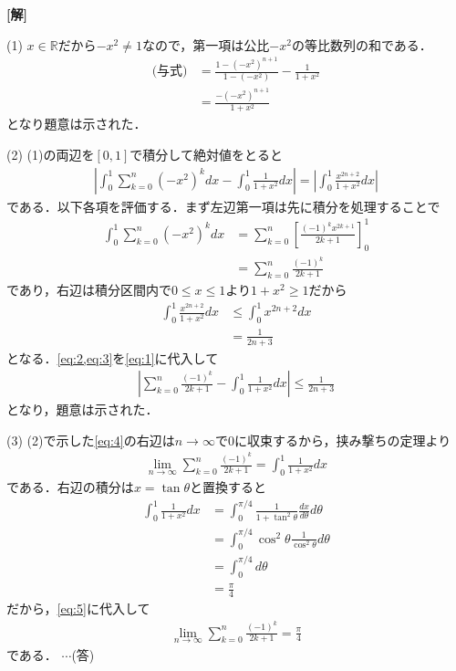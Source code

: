 \documentclass[a4paper,10pt]{ltjsarticle}
\begin{document}
\begin{multicols}{2}
  {\bf[解]}

  (1)
  $x \in \mathbb{R}$だから$-x^2 \neq 1$なので，第一項は公比$-x^2$の等比数列の和である．
  \begin{align*}
    \text{(与式)}
     & = \frac{1-(-x^2)^{n+1}}{1-(-x^2)} - \frac{1}{1+x^2} \\
     & = \frac{-(-x^2)^{n+1}}{1+x^2}
  \end{align*}
  となり題意は示された．

  \vspace{10pt}
  (2)
  (1)の両辺を$[0,1]$で積分して絶対値をとると
  \begin{align}
    \left| \int_0^1 \sum_{k=0}^n (-x^2)^k dx - \int_0^1 \frac{1}{1+x^2} dx \right|
    = \left| \int_0^1 \frac{x^{2n+2}}{1+x^2} dx \right| \label{eq:1}
  \end{align}
  である．以下各項を評価する．まず左辺第一項は先に積分を処理することで
  \begin{align}
    \int_0^1 \sum_{k=0}^n (-x^2)^k dx
     & = \sum_{k=0}^n \left[ \frac{(-1)^k x^{2k+1}}{2k+1} \right]_0^1 \nonumber \\
     & = \sum_{k=0}^n \frac{(-1)^k}{2k+1} \label{eq:2}
  \end{align}
  であり，右辺は積分区間内で$0\le x\le 1$より$1+x^2\ge 1$だから
  \begin{align}
    \int_0^1 \frac{x^{2n+2}}{1+x^2} dx
     & \le \int_0^1 x^{2n+2} dx      \nonumber \\
     & = \frac{1}{2n+3} \label{eq:3}
  \end{align}
  となる．\cref{eq:2,eq:3}を\cref{eq:1}に代入して
  \begin{align}
    \left| \sum_{k=0}^n \frac{(-1)^k}{2k+1} - \int_0^1 \frac{1}{1+x^2} dx \right| \le \frac{1}{2n+3} \label{eq:4}
  \end{align}
  となり，題意は示された．

  \vspace{10pt}
  (3)
  (2)で示した\cref{eq:4}の右辺は$n\to\infty$で$0$に収束するから，挟み撃ちの定理より
  \begin{align}
    \lim_{n\to\infty} \sum_{k=0}^n \frac{(-1)^k}{2k+1} = \int_0^1 \frac{1}{1+x^2} dx \label{eq:5}
  \end{align}
  である．右辺の積分は$x=\tan\theta$と置換すると
  \begin{align*}
    \int_0^1 \frac{1}{1+x^2} dx
     & = \int_0^{\pi/4} \frac{1}{1+\tan^2\theta} \frac{dx}{d\theta} d\theta \\
     & = \int_0^{\pi/4} \cos^2\theta \frac{1}{\cos^2\theta} d\theta         \\
     & = \int_0^{\pi/4} d\theta                                             \\
     & = \frac{\pi}{4}
  \end{align*}
  だから，\cref{eq:5}に代入して
  \begin{align*}
    \lim_{n\to\infty} \sum_{k=0}^n \frac{(-1)^k}{2k+1} = \frac{\pi}{4}
  \end{align*}
  である．  $\cdots$(答)



\end{multicols}
\end{document}
